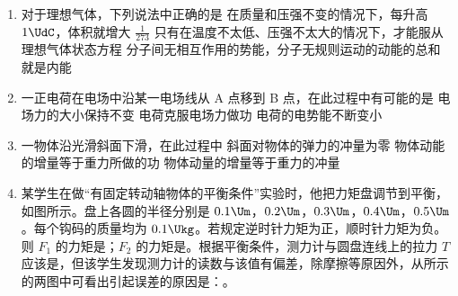 \documentclass[\gkver]{gaokaozhenti}
\begin{document}
\begin{enumerate}

\item
对于理想气体，下列说法中正确的是
{在质量和压强不变的情况下，每升高 $1\UdC$，体积就增大 $\frac{1}{273}$}
{只有在温度不太低、压强不太大的情况下，才能服从理想气体状态方程}
{分子间无相互作用的势能，分子无规则运动的动能的总和就是内能}


\item
一正电荷在电场中沿某一电场线从 A 点移到 B 点，在此过程中有可能的是
\onepicture[w=5.00cm]{}
{电场力的大小保持不变}
{电荷克服电场力做功}
{电荷的电势能不断变小}


\item
一物体沿光滑斜面下滑，在此过程中
{斜面对物体的弹力的冲量为零}
{物体动能的增量等于重力所做的功}
{物体动量的增量等于重力的冲量}


\item
某学生在做“有固定转动轴物体的平衡条件”实验时，他把力矩盘调节到平衡，如图所示。盘上各圆的半径分别是 $0.1\Um$，$0.2\Um$，$0.3\Um$，$0.4\Um$，$0.5\Um$。每个钩码的质量均为 $0.1\Ukg$。若规定逆时针力矩为正，顺时针力矩为负。则 $F_{1}$ 的力矩是\tkanswer{$-0.12\Ukgf\cdot\Um$}；$F_{2}$ 的力矩是\tkanswer{$0.06\Ukgf\cdot\Um$}。根据平衡条件，测力计与圆盘连线上的拉力 $T$ 应该是\tkanswer{$0.3\Ukgf$}，但该学生发现测力计的读数与该值有偏差，除摩擦等原因外，从所示的两图中可看出引起误差的原因是：。


\end{enumerate}
\end{document}
